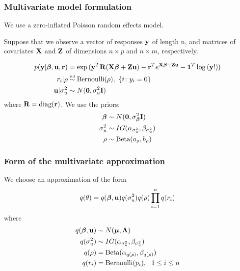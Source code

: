 \documentclass{beamer}
\begin{document}
\begin{frame}
\frametitle{Multivariate model formulation}
We use a zero-inflated Poisson random effects model.

\medskip

Suppose that we observe a vector of responses ${\bf y}$ of length n, and matrices
of covariates ${\bf X}$ and ${\bf Z}$ of dimensions $n \times p$ and $n \times m$,
respectively.

\begin{align*}
p({\bf y}|{\boldsymbol \beta}, {\bf u}, {\bf r}) &= \exp{({\bf y}^T{\bf R}({\bf X}{\boldsymbol\beta}+ {\bf Z}{\bf u}) - {\bf r}^Te^{{\bf X}{\boldsymbol\beta}+ {\bf Z}{\bf u}} - {\bf1}^T\log{({\bf y}!)})} \\
r_i|\rho & \stackrel{\mbox{\tiny iid}}{\sim} \text{Bernoulli}(\rho), \ \{i \colon y_i=0\} \\
{\bf u}|\sigma_u^2 &\sim N({\bf 0}, \sigma_u^2 {\bf I}) \\
\end{align*}
\noindent where ${\bf R} =\mbox{diag}({\bf r})$.
We use the priors:
\begin{align*}
{\boldsymbol\beta} &\sim N({\bf 0}, \sigma_{\boldsymbol \beta}^2{\bf I}) \\
\sigma_u^2 &\sim IG(\alpha_{\sigma_u^2}, \beta_{\sigma_u^2}) \\
\rho &\sim \text{Beta}(a_\rho, b_\rho) \\
\end{align*}
\end{frame}




\begin{frame}
\frametitle{Form of the multivariate approximation}
We choose an approximation of the form
$$
q(\theta) = q({\boldsymbol \beta}, {\bf u}) q(\sigma_u^2) q(\rho) \prod_{i=1}^n q(r_i)
$$
where
\begin{align*}
q({\boldsymbol \beta}, {\bf u}) &\sim N({\boldsymbol \mu}, {\boldsymbol \Lambda}) \\
q(\sigma_u^2) &\sim IG(\alpha_{\sigma_u^2}, \beta_{\sigma_u^2}) \\
q(\rho) &= \text{Beta}(\alpha_{q(\rho)}, \beta_{q(\rho)}) \\
q(r_i) &= \text{Bernoulli}(p_i), \ \ 1 \leq i \leq n
\end{align*}
\end{frame}
\end{document}
